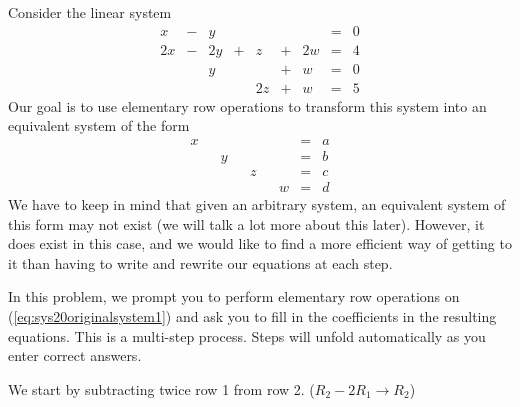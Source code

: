 \documentclass{ximera}
\begin{document}
\begin{exploration}\label{init:augmentedmatrixex}
Consider the linear system
\begin{equation}\label{eq:sys20originalsystem1}
\begin{array}{ccccccccc}
      x &- &y&&&&&= &0 \\
	 2x& -&2y&+&z&+&2w&=&4\\
     & &y&&&+&w&=&0\\
     & &&&2z&+&w&=&5
    \end{array}
    \end{equation}
Our goal is to use elementary row operations to transform this system into an equivalent system of the form
\begin{equation}\begin{array}{ccccccccc}
      x & &&&&&&= &a \\
	 & &y&&&&&=&b\\
     & &&&z&&&=&c\\
     & &&&&&w&=&d
    \end{array}
    \end{equation}
 We have to keep in mind that given an arbitrary system, an equivalent system of this form may not exist (we will talk a lot more about this later).  However, it does exist in this case, and we would like to find a more efficient way of getting to it than having to write and rewrite our equations at each step.   
 
In this problem, we prompt you to perform elementary row operations on (\ref{eq:sys20originalsystem1}) and ask you to fill in the coefficients in the resulting equations.  This is a multi-step process.  Steps will unfold automatically as you enter correct answers.


\begin{problem}
We start by subtracting twice row 1 from row 2. ($R_2-2R_1\rightarrow R_2$)


\end{problem}
\end{exploration}
\end{document}
